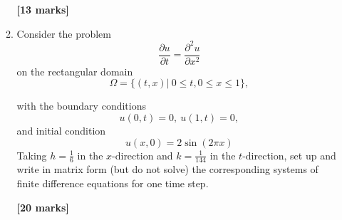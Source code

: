 \begin{enumerate}
\begin{enumerate}
\begin{flushright}
\textbf{[13 marks]}
\end{flushright}
	\item Consider the problem
	\[\frac{\partial u}{\partial t}=\frac{\partial^2 u}{\partial x^2} \]
	on the rectangular domain
		\[\Omega=\{(t,x)| \ 0\leq t, 0 \leq x \leq 1\}, \]

	with the boundary conditions
	\[ u(0,t)=0, \ u(1,t)=0,   \]
	and initial condition
	\[	u(x,0)=2\sin(2\pi x) \]
		Taking $h=\frac{1}{6}$ in the $x$-direction and $k=\frac{1}{144}$ in the $t$-direction, set up and write in matrix form (but do not solve) the corresponding systems of finite difference equations for one time step.\\
\begin{flushright}
\textbf{[20 marks]}
\end{flushright}
	
	
\end{enumerate}


\end{enumerate}

